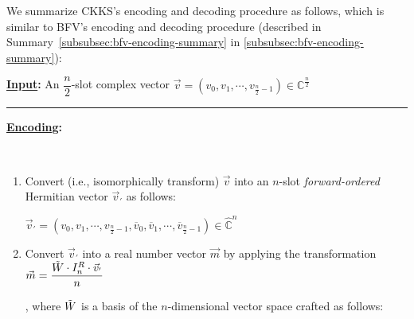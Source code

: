 We summarize CKKS's encoding and decoding procedure as follows, which is similar to BFV's encoding and decoding procedure (described in Summary~\ref*{subsubsec:bfv-encoding-summary} in \autoref{subsubsec:bfv-encoding-summary}):

\begin{tcolorbox}[title={\textbf{\tboxlabel{\ref*{subsec:ckks-encoding-decoding}} CKKS's Encoding and Decoding}}]

\textbf{\underline{Input}:} An $\dfrac{n}{2}$-slot complex vector $\vec{v} = (v_0, v_1, \cdots, v_{\frac{n}{2}-1}) \in \mathbb{C}^{\frac{n}{2}}$

\par\noindent\rule{\textwidth}{0.4pt}

\textbf{\underline{Encoding}:}

$ $

\begin{enumerate}
\item Convert (i.e., isomorphically transform) $\vec{v}$ into an $n$-slot \textit{forward-ordered} Hermitian vector $\vec{v}_{'}$ as follows:

$\vec{v}_{'} = (v_0, v_1, \cdots, v_{\frac{n}{2}-1}, \overline v_0, \overline v_1, \cdots, \overline v_{\frac{n}{2}-1}) \in \mathbb{\hat C}^{n}$

\item Convert $\vec{v}_{'}$ into a real number vector $\vec{m}$ by applying the transformation $\vec{m} = \dfrac{\tilde W \cdot I_n^R \cdot \vec{v}_{'}}{n}$

, where $\tilde{W}$ is a basis of the $n$-dimensional vector space crafted as follows: 

$ $



\end{enumerate}
\end{tcolorbox}

